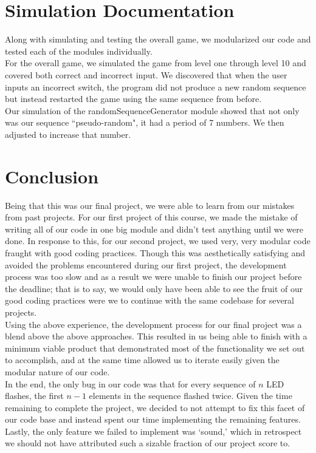 \documentclass[]{article}
\begin{document}
\section{Simulation Documentation}

Along with simulating and testing the overall game, we modularized our code and tested each of the modules individually. \\

For the overall game, we simulated the game from level one through level 10 and covered both correct and incorrect input. We discovered that when the user inputs an incorrect switch, the program did not produce a new random sequence but instead restarted the game using the same sequence from before. \\

Our simulation of the randomSequenceGenerator module showed that not only was our sequence ``pseudo-random", it had a period of 7 numbers. We then adjusted to increase that number.

\section{Conclusion}
Being that this was our final project, we were able to learn from our mistakes from past projects. For our first project of this course, we made the mistake of writing all of our code in one big module and didn't test anything until we were done. In response to this, for our second project, we used very, very modular code fraught with good coding practices. Though this was aesthetically satisfying and avoided the problems encountered during our first project, the development process was too slow and as a result we were unable to finish our project before the deadline; that is to say, we would only have been able to see the fruit of our good coding practices were we to continue with the same codebase for several projects.\\

Using the above experience, the development process for our final project was a blend above the above approaches. This resulted in us being able to finish with a minimum viable product that demonstrated most of the functionality we set out to accomplish, and at the same time allowed us to iterate easily given the modular nature of our code.\\

In the end, the only bug in our code was that for every sequence of $n$ LED flashes, the first $n-1$ elements in the sequence flashed twice. Given the time remaining to complete the project, we decided to not attempt to fix this facet of our code base and instead spent our time implementing the remaining features.\\

Lastly, the only feature we failed to implement was `sound,' which in retrospect we should not have attributed such a sizable fraction of our project score to.
\end{document}
